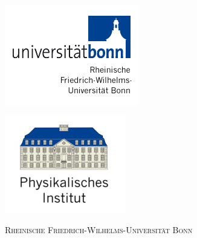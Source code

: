 \begin{titlepage}
  \thispagestyle{empty}
  \begin{center}

    \begin{minipage}{0.5\textwidth}
      \begin{flushleft}
	\includegraphics[width=.5\textwidth]{Figures/Logos/logoUNI.png}
      \end{flushleft}
    \end{minipage}%
    \begin{minipage}{0.5\textwidth}
      \begin{flushright}
	\includegraphics[width=.5\textwidth]{Figures/Logos/logoPI.png}
      \end{flushright}
    \end{minipage}
    
    \vspace{25 pt}
    
    \textsc{\LARGE Rheinische Friedrich-Wilhelms-Universität Bonn}\\[1.5 cm]
    
    \vspace{50 pt}
    

\end{center}
\end{titlepage}
